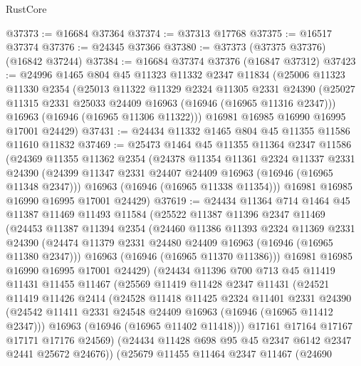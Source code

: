 \begin{lexlean}{RustCore}
\begin{coremodule}
@37373 := @16684 @37364
@37374 := @37313 @17768
@37375 := @16517 @37374
@37376 := @24345 @37366
@37380 := @37373 (@37375 @37376) (@16842 @37244)
@37384 := @16684 @37374 @37376 (@16847 @37312)
@37423 := @24996
    @1465
    @804
    @45
    @11323
    @11332
    @2347
    @11834
    (@25006
      @11323
      @11330
      @2354
      (@25013
        @11322
        @11329
        @2324
        @11305
        @2331
        @24390
        (@25027 @11315 @2331 @25033 @24409 @16963 (@16946 (@16965 @11316 @2347)))
        @16963
        (@16946 (@16965 @11306 @11322)))
      @16981
      @16985
      @16990
      @16995
      @17001
      @24429)
@37431 := @24434 @11332 @1465 @804 @45 @11355 @11586 @11610 @11832
@37469 := @25473
    @1464
    @45
    @11355
    @11364
    @2347
    @11586
    (@24369
      @11355
      @11362
      @2354
      (@24378
        @11354
        @11361
        @2324
        @11337
        @2331
        @24390
        (@24399 @11347 @2331 @24407 @24409 @16963 (@16946 (@16965 @11348 @2347)))
        @16963
        (@16946 (@16965 @11338 @11354)))
      @16981
      @16985
      @16990
      @16995
      @17001
      @24429)
@37619 := @24434
    @11364
    @714
    @1464
    @45
    @11387
    @11469
    @11493
    @11584
    (@25522
      @11387
      @11396
      @2347
      @11469
      (@24453
        @11387
        @11394
        @2354
        (@24460
          @11386
          @11393
          @2324
          @11369
          @2331
          @24390
          (@24474 @11379 @2331 @24480 @24409 @16963 (@16946 (@16965 @11380 @2347)))
          @16963
          (@16946 (@16965 @11370 @11386)))
        @16981
        @16985
        @16990
        @16995
        @17001
        @24429)
      (@24434
        @11396
        @700
        @713
        @45
        @11419
        @11431
        @11455
        @11467
        (@25569
          @11419
          @11428
          @2347
          @11431
          (@24521
            @11419
            @11426
            @2414
            (@24528
              @11418
              @11425
              @2324
              @11401
              @2331
              @24390
              (@24542 @11411 @2331 @24548 @24409 @16963 (@16946 (@16965 @11412 @2347)))
              @16963
              (@16946 (@16965 @11402 @11418)))
            @17161
            @17164
            @17167
            @17171
            @17176
            @24569)
          (@24434 @11428 @698 @95 @45 @2347 @6142 @2347 @2441 @25672 @24676))
        (@25679
          @11455
          @11464
          @2347
          @11467
          (@24690

\end{coremodule}
\end{lexlean}
